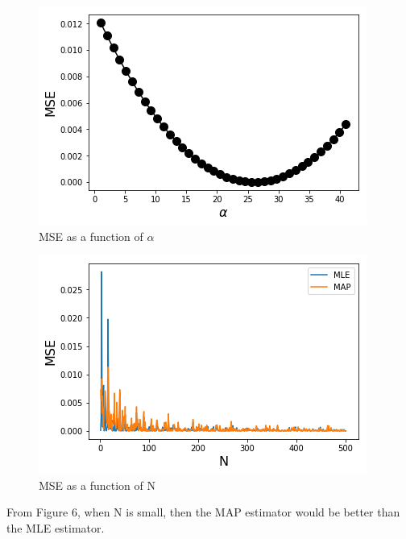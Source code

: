 \documentclass{article}
\begin{document}
\begin{figure}[ht]
\centering
\includegraphics[scale=0.5]{HW2_P6_c1.png}
\caption{MSE as a function of $\alpha$}
\end{figure}

\begin{figure}[ht]
\centering
\includegraphics[scale=0.5]{HW2_P6_c2.png}
\caption{MSE as a function of N}
\end{figure}

From Figure 6, when N is small, then the MAP estimator would be better than the MLE estimator.
%
%
\end{document}
